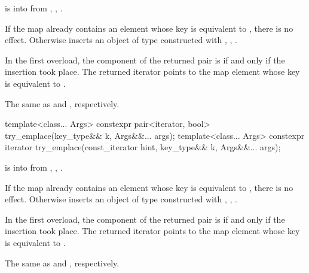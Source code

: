 \begin{itemdescr}
\pnum
\expects
{} is  into 
from , ,
.

\pnum
\effects
If the map already contains an element
whose key is equivalent to ,
there is no effect.
Otherwise inserts an object of type 
constructed with , ,
.

\pnum
\returns
In the first overload,
the  component of the returned pair is 
if and only if the insertion took place.
The returned iterator points to the map element
whose key is equivalent to .

\pnum
\complexity
The same as  and ,
respectively.
\end{itemdescr}

%
\begin{itemdecl}
template<class... Args>
  constexpr pair<iterator, bool> try_emplace(key_type&& k, Args&&... args);
template<class... Args>
  constexpr iterator try_emplace(const_iterator hint, key_type&& k, Args&&... args);
\end{itemdecl}

\begin{itemdescr}
\pnum
\expects
{} is  into 
from , ,
.

\pnum
\effects
If the map already contains an element
whose key is equivalent to ,
there is no effect.
Otherwise inserts an object of type 
constructed with , ,
.

\pnum
\returns
In the first overload,
the  component of the returned pair is 
if and only if the insertion took place.
The returned iterator points to the map element
whose key is equivalent to .

\pnum
\complexity
The same as  and ,
respectively.
\end{itemdescr}

